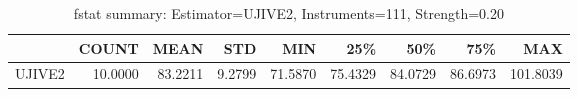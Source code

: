 \begin{table}[ht]
\centering
\caption{fstat summary: Estimator=UJIVE2, Instruments=111, Strength=0.20}
\begin{tabular}{lrrrrrrrr}
\toprule
 & COUNT & MEAN & STD & MIN & 25\% & 50\% & 75\% & MAX \\
\midrule
UJIVE2 & 10.0000 & 83.2211 & 9.2799 & 71.5870 & 75.4329 & 84.0729 & 86.6973 & 101.8039 \\
\bottomrule
\end{tabular}
\end{table}
